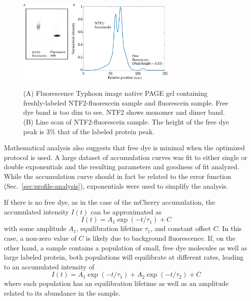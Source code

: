 \begin{figure} %
\caption[Quantifying free dye concentration.]{(A) Fluorescence Typhoon image native PAGE gel containing freshly-labeled NTF2-fluorescein sample and fluorescein sample.  Free dye band is too dim to see. NTF2 shows monomer and dimer band.  (B) Line scan of NTF2-fluorescein sample.  The height of the free dye peak is 3\% that of the labeled protein peak.\\}
\centering
\includegraphics[width=0.7\textwidth]{figs/ch03/free-dye-typhoon}
\label{fig:free-dye-typhoon}
\end{figure} 

Mathematical analysis also suggests that free dye is minimal when the optimized protocol is used.  A large dataset of accumulation curves was fit to either single or double exponentials and the resulting parameters and goodness of fit analyzed.  While the accumulation curve should in fact be related to the error function (Sec.~\ref{sec:profile-analysis}), exponentials were used to simplify the analysis.

If there is no free dye, as in the case of the mCherry accumulation, the accumulated intensity $I(t)$ can be approximated as
\begin{equation}
I(t) = A_1\exp(-t/\tau_1) +C
\label{eq:single-exp}
\end{equation}
with some amplitude $A_1$, equilibration lifetime $\tau_1$, and constant offset $C$.  In this case, a non-zero value of $C$ is likely due to background fluorescence.  If, on the other hand, a sample contains a population of small, free dye molecules as well as large labeled protein, both populations will equilibrate at different rates, leading to an accumulated intensity of
\begin{equation}
I(t) = A_1\exp(-t/\tau_1) + A_2\exp(-t/\tau_2)+C
\label{eq:double-exp}
\end{equation}
where each population has an equilibration lifetime as well as an amplitude related to its abundance in the sample.

